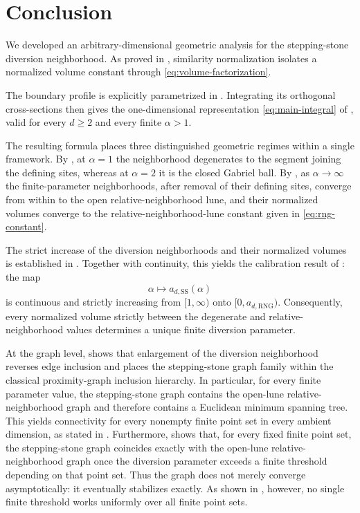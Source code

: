 \documentclass[a4paper,fleqn]{cas-dc}
\theoremstyle{definition}
\theoremstyle{remark}
\newcommand{\0}{\mathbf{0}}
\begin{document}
\section{Conclusion}
\label{sec:conclusion}

We developed an arbitrary-dimensional geometric analysis
for the
stepping-stone diversion neighborhood. As proved in
, similarity normalization isolates a normalized
volume constant through \eqref{eq:volume-factorization}.

The boundary profile is explicitly parametrized in
. Integrating its orthogonal
cross-sections then gives the one-dimensional representation
\eqref{eq:main-integral} of , valid for every
$d\geq2$ and every finite $\alpha>1$.

The resulting formula places three distinguished geometric regimes within
a single framework. By , at $\alpha=1$ the
neighborhood degenerates to the segment joining the defining sites, whereas
at $\alpha=2$ it is the closed Gabriel ball. By
, as $\alpha\to\infty$ the finite-parameter
neighborhoods, after removal of their defining sites, converge from within
to the open relative-neighborhood lune, and their normalized volumes
converge to the relative-neighborhood-lune constant given in
\eqref{eq:rng-constant}.

The strict increase of the diversion neighborhoods and their normalized
volumes is established in . Together with
continuity, this yields the calibration result of
: the map
\begin{equation}
\alpha\longmapsto a_{d,\mathrm{SS}}(\alpha)
\end{equation}
is continuous and strictly increasing from $[1,\infty)$ onto
$[0,a_{d,\mathrm{RNG}})$. Consequently, every normalized volume strictly
between the degenerate and relative-neighborhood values determines a unique
finite diversion parameter.

At the graph level,  shows that enlargement of the
diversion neighborhood reverses edge inclusion and places the stepping-stone
graph family within the classical proximity-graph inclusion hierarchy. In particular, for every finite parameter value, the stepping-stone graph contains the open-lune
relative-neighborhood graph and therefore contains a Euclidean minimum
spanning tree. This yields connectivity for every nonempty finite point set
in every ambient dimension, as stated in .
Furthermore,  shows that, for every fixed
finite point set, the stepping-stone graph coincides exactly with the
open-lune relative-neighborhood graph once the diversion parameter exceeds
a finite threshold depending on that point set. Thus the graph does not
merely converge asymptotically: it eventually stabilizes exactly. As shown
in , however, no single finite threshold
works uniformly over all finite point sets.
\end{document}
